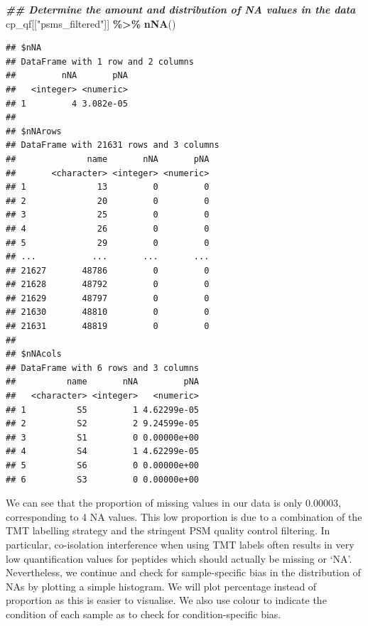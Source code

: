 \documentclass[9pt,a4paper,]{extarticle}
\newenvironment{Shaded}{\begin{snugshade}}{\end{snugshade}}
\newcommand{\DocumentationTok}[1]{\textcolor[rgb]{0.56,0.35,0.01}{\textbf{\textit{#1}}}}
\newcommand{\FunctionTok}[1]{\textcolor[rgb]{0.13,0.29,0.53}{\textbf{#1}}}
\newcommand{\NormalTok}[1]{#1}
\newcommand{\SpecialCharTok}[1]{\textcolor[rgb]{0.81,0.36,0.00}{\textbf{#1}}}
\newcommand{\StringTok}[1]{\textcolor[rgb]{0.31,0.60,0.02}{#1}}
\begin{document}
\begin{Shaded}
\begin{Highlighting}[]
\DocumentationTok{\#\# Determine the amount and distribution of NA values in the data}
\NormalTok{cp\_qf[[}\StringTok{"psms\_filtered"}\NormalTok{]] }\SpecialCharTok{\%\textgreater{}\%}
  \FunctionTok{nNA}\NormalTok{()}
\end{Highlighting}
\end{Shaded}

\begin{verbatim}
## $nNA
## DataFrame with 1 row and 2 columns
##         nNA       pNA
##   <integer> <numeric>
## 1         4 3.082e-05
## 
## $nNArows
## DataFrame with 21631 rows and 3 columns
##              name       nNA       pNA
##       <character> <integer> <numeric>
## 1              13         0         0
## 2              20         0         0
## 3              25         0         0
## 4              26         0         0
## 5              29         0         0
## ...           ...       ...       ...
## 21627       48786         0         0
## 21628       48792         0         0
## 21629       48797         0         0
## 21630       48810         0         0
## 21631       48819         0         0
## 
## $nNAcols
## DataFrame with 6 rows and 3 columns
##          name       nNA         pNA
##   <character> <integer>   <numeric>
## 1          S5         1 4.62299e-05
## 2          S2         2 9.24599e-05
## 3          S1         0 0.00000e+00
## 4          S4         1 4.62299e-05
## 5          S6         0 0.00000e+00
## 6          S3         0 0.00000e+00
\end{verbatim}

We can see that the proportion of missing values in our data is only 0.00003, corresponding to 4 NA values. This low proportion is due to a
combination of the TMT labelling strategy and the stringent PSM quality control
filtering. In particular, co-isolation interference when using TMT labels often
results in very low quantification values for peptides which should actually be
missing or `NA'. Nevertheless, we continue and check for sample-specific bias in
the distribution of NAs by plotting a simple histogram. We will plot percentage
instead of proportion as this is easier to visualise. We also use colour to
indicate the condition of each sample as to check for condition-specific bias.
\end{document}

